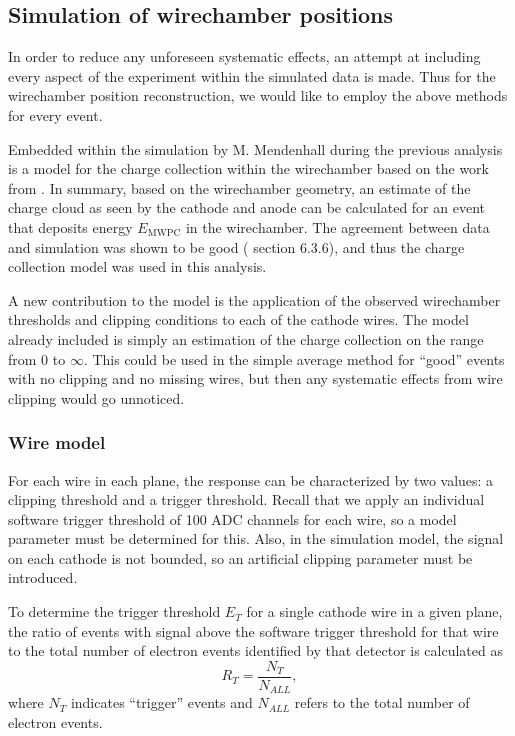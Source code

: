 \subsection{Simulation of wirechamber positions}

In order to reduce any unforeseen systematic effects, an attempt at including
every aspect of the experiment within the simulated data is made. Thus for the wirechamber
position reconstruction, we would like to employ the above methods for every event. 

Embedded within the simulation by M. Mendenhall during the previous analysis
is a model for the charge collection within the wirechamber based on the work
from \cite{mathieson1991induced}. In summary, based on the wirechamber geometry, an estimate
of the charge cloud as seen by the cathode and anode can be calculated for an event
that deposits energy $E_{\mathrm{MWPC}}$ in the wirechamber. The agreement between data and simulation was
shown to be good (\cite{mpmThesis} section 6.3.6), and thus the charge collection
model was used in this analysis.

A new contribution to the model is the application of the observed wirechamber thresholds
and clipping conditions to each of the cathode wires. The model already included is simply an estimation of the charge
collection on the range from $0$ to $\infty$. This could be used in the simple average method for ``good'' events
with no clipping and no missing wires, but then any systematic effects from wire clipping would go unnoticed.

\subsubsection{Wire model}

For each wire in each plane, the response can be characterized by two values: a clipping threshold and a trigger threshold.
Recall that we apply an individual software trigger threshold of 100 ADC channels for each wire, so a model parameter must
be determined for this. Also, in the simulation model, the signal on each cathode is not bounded, so an artificial
clipping parameter must be introduced.

To determine the trigger threshold $E_T$ for a single cathode wire in a given plane, the ratio of
events with signal above the software trigger threshold for that wire
to the total number of electron events identified by that detector is calculated as
\begin{equation}
  R_{T} = \frac{N_T}{N_{ALL}},
\end{equation}
where $N_T$ indicates ``trigger'' events and $N_{ALL}$ refers to the total number of electron events.


